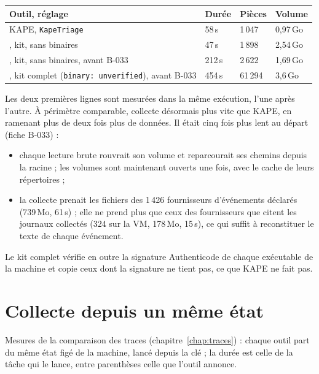 \documentclass[11pt,a4paper,oneside]{report}
\begin{document}
\begin{longtable}{@{}L{5.4cm}L{2.2cm}L{2.4cm}L{5.0cm}@{}}
\toprule
\textbf{Outil, réglage} & \textbf{Durée} & \textbf{Pièces} & \textbf{Volume} \\
\midrule\endhead
KAPE, \texttt{KapeTriage} & 58\,s & 1\,047 & 0,97\,Go \\
\wac{}, kit, sans binaires & 47\,s & 1\,898 & 2,54\,Go \\
\wac{}, kit, sans binaires, avant B-033 & 212\,s & 2\,622 & 1,69\,Go \\
\wac{}, kit complet (\texttt{binary: unverified}), avant B-033 & 454\,s & 61\,294 & 3,6\,Go \\
\bottomrule
\end{longtable}

Les deux premières lignes sont mesurées dans la même exécution, l'une après
l'autre. À périmètre comparable, \wac{} collecte désormais plus vite que KAPE,
en ramenant plus de deux fois plus de données. Il était cinq fois plus lent au
départ (fiche B-033) :
\begin{itemize}
  \item chaque lecture brute rouvrait son volume et reparcourait ses chemins
        depuis la racine ; les volumes sont maintenant ouverts une fois, avec le
        cache de leurs répertoires ;
  \item la collecte prenait les fichiers des 1\,426 fournisseurs d'événements
        déclarés (739\,Mo, 61\,s) ; elle ne prend plus que ceux des fournisseurs
        que citent les journaux collectés (324 sur la VM, 178\,Mo, 15\,s), ce qui
        suffit à reconstituer le texte de chaque événement.
\end{itemize}
Le kit complet vérifie en outre la signature Authenticode de chaque exécutable
de la machine et copie ceux dont la signature ne tient pas, ce que KAPE ne fait
pas.

\section{Collecte depuis un même état}

Mesures de la comparaison des traces (chapitre~\ref{chap:traces}) : chaque
outil part du même état figé de la machine, lancé depuis la clé ; la durée est
celle de la tâche qui le lance, entre parenthèses celle que l'outil annonce.
\end{document}
